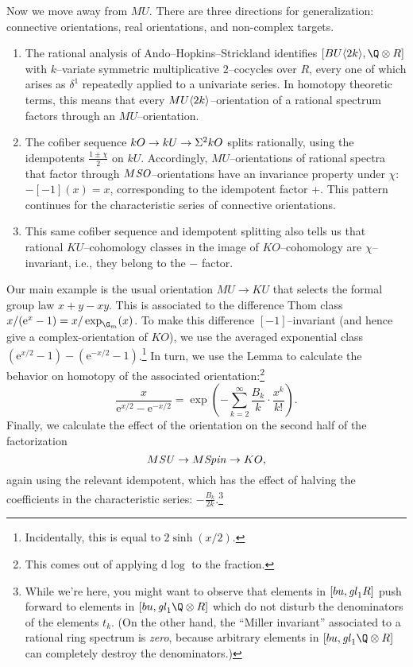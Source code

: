 Now we move away from $MU$.  There are three directions for generalization: connective orientations, real orientations, and non-complex targets.
\begin{enumerate}
\item The rational analysis of Ando--Hopkins--Strickland identifies $[BU\<2k\>, \Q \otimes R]$ with $k$--variate symmetric multiplicative $2$--cocycles over $R$, every one of which arises as $\delta^1$ repeatedly applied to a univariate series.  In homotopy theoretic terms, this means that every $MU\langle2k\rangle$--orientation of a rational spectrum factors through an $MU$--orientation.
\item The cofiber sequence $kO \to kU \to \Sigma^2 kO$ splits rationally, using the idempotents $\frac{1 \pm \chi}{2}$ on $kU$.  Accordingly, $MU$--orientations of rational spectra that factor through $M\mathit{SO}$--orientations have an invariance property under $\chi$: $-[-1](x) = x$, corresponding to the idempotent factor $+$.  This pattern continues for the characteristic series of connective orientations.
\item This same cofiber sequence and idempotent splitting also tells us that rational $KU$--cohomology classes in the image of $KO$--cohomology are $\chi$--invariant, i.e., they belong to the $-$ factor.
\end{enumerate}

Our main example is the usual orientation $MU \to KU$ that selects the formal group law $x + y - xy$.  This is associated to the difference Thom class $x / (\mathrm{e}^x - 1) = x / \exp_{\G_m}(x)$.  To make this difference $[-1]$--invariant (and hence give a complex-orientation of $KO$), we use the averaged exponential class $(\mathrm{e}^{x/2} - 1) - (\mathrm{e}^{-x/2} - 1)$.\footnote{Incidentally, this is equal to $2\operatorname{sinh}(x/2)$.}  In turn, we use the Lemma to calculate the behavior on homotopy of the associated orientation:\footnote{This comes out of applying $\mathrm{d}\log$ to the fraction.} \[\frac{x}{\mathrm e^{x/2} - \mathrm e^{-x/2}} = \exp\left(-\sum_{k=2}^\infty \frac{B_k}{k} \cdot \frac{x^k}{k!}\right).\]  Finally, we calculate the effect of the orientation on the second half of the factorization \[M\mathit{SU} \to M\mathit{Spin} \to KO,\] again using the relevant idempotent, which has the effect of halving the coefficients in the characteristic series: $-\frac{B_k}{2k}$.\footnote{While we're here, you might want to observe that elements in $[bu, \mathit{gl}_1 R]$ push forward to elements in $[bu, \gl_1 \Q \otimes R]$ which do not disturb the denominators of the elements $t_k$.  (On the other hand, the ``Miller invariant'' associated to a rational ring spectrum is \emph{zero}, because arbitrary elements in $[bu, \gl_1 \Q \otimes R]$ can completely destroy the denominators.)}

